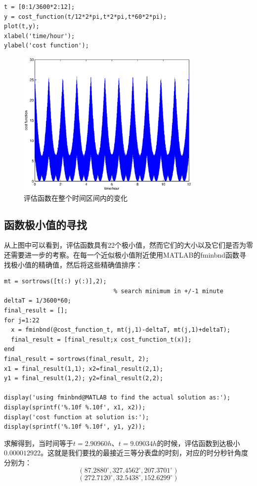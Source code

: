 \documentclass[paper=a4, fontsize=11pt]{scrartcl} %
\numberwithin{equation}{section} %
\numberwithin{figure}{section} %
\numberwithin{table}{section} %
\begin{document}
\begin{CJK*}{UTF8}{gbsn}
\lstset{language=MATLAB}
\begin{lstlisting}
t = [0:1/3600*2:12];
y = cost_function(t/12*2*pi,t*2*pi,t*60*2*pi);
plot(t,y);
xlabel('time/hour');
ylabel('cost function');
\end{lstlisting}


\begin{figure}[ht!]
\centering
\includegraphics[width=90mm]{problem1_cost_function.eps}
\caption{评估函数在整个时间区间内的变化}
\end{figure}

\subsection{函数极小值的寻找}
从上图中可以看到，评估函数具有22个极小值，然而它们的大小以及它们是否为零还需要进一步的考察。在每一个近似极小值附近使用MATLAB的fminbnd函数寻找极小值的精确值，然后将这些精确值排序：

\lstset{language=MATLAB}
\begin{lstlisting}
mt = sortrows([t(:) y(:)],2);
                               % search minimum in +/-1 minute
deltaT = 1/3600*60;
final_result = [];
for j=1:22
  x = fminbnd(@cost_function_t, mt(j,1)-deltaT, mt(j,1)+deltaT);
  final_result = [final_result;x cost_function_t(x)];
end
final_result = sortrows(final_result, 2);
x1 = final_result(1,1); x2=final_result(2,1);
y1 = final_result(1,2); y2=final_result(2,2);

display('using fminbnd@MATLAB to find the actual solution as:');
display(sprintf('%.10f %.10f', x1, x2));
display('cost function at solution is:');
display(sprintf('%.10f %.10f', y1, y2));
\end{lstlisting}
求解得到，当时间等于$t=2.90960 h$、$t=9.09034 h$的时候，评估函数到达极小$0.000012922$。这就是我们要找的最接近三等分表盘的时刻，对应的时分秒针角度分别为：$$(87.2880^{\circ},327.4562^{\circ},207.3701^{\circ})$$ $$(272.7120^{\circ}, 32.5438^{\circ},152.6299^{\circ})$$


\end{CJK*}
\end{document}
